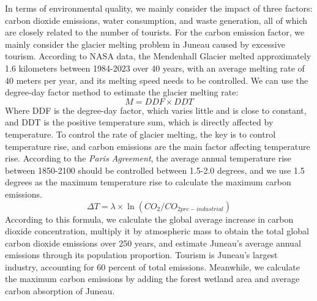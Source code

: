 \documentclass[12pt]{article}  %
\begin{document}
In terms of environmental quality, we mainly consider the impact of three factors: carbon dioxide emissions, water consumption, and waste generation, all of which are closely related to the number of tourists.
For the carbon emission factor, we mainly consider the glacier melting problem in Juneau caused by excessive tourism. According to NASA data, the Mendenhall Glacier melted approximately 1.6 kilometers between 1984-2023 over 40 years, with an average melting rate of 40 meters per year, and its melting speed needs to be controlled. We can use the degree-day factor method to estimate the glacier melting rate:
\begin{equation}
    M=DDF\times DDT
\end{equation}
Where DDF is the degree-day factor, which varies little and is close to constant, and DDT is the positive temperature sum, which is directly affected by temperature. To control the rate of glacier melting, the key is to control temperature rise, and carbon emissions are the main factor affecting temperature rise. According to the \textit{Paris Agreement}, the average annual temperature rise between 1850-2100 should be controlled between 1.5-2.0 degrees, and we use 1.5 degrees as the maximum temperature rise to calculate the maximum carbon emissions.
\begin{equation}
    \Delta T=\lambda\times \ln(CO_{2}/CO_{2pre-industrial})
\end{equation}
According to this formula, we calculate the global average increase in carbon dioxide concentration, multiply it by atmospheric mass to obtain the total global carbon dioxide emissions over 250 years, and estimate Juneau's average annual emissions through its population proportion. Tourism is Juneau's largest industry, accounting for 60 percent of total emissions. Meanwhile, we calculate the maximum carbon emissions by adding the forest wetland area and average carbon absorption of Juneau.
\end{document}
